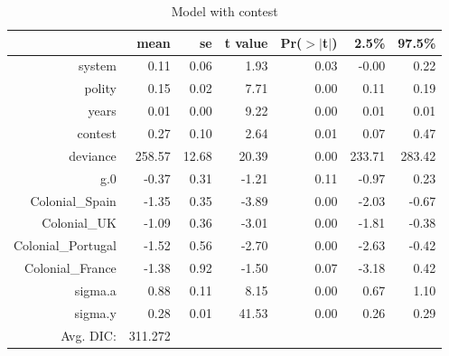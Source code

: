 \documentclass[12pt]{article}
\begin{document}
\begin{table}[ht]
\centering
\begin{tabular}{rrrrrrr}
  \hline
 & mean & se & t value & Pr($>$$|$t$|$) & 2.5\% & 97.5\% \\ 
  \hline
system & 0.11 & 0.06 & 1.93 & 0.03 & -0.00 & 0.22 \\ 
  polity & 0.15 & 0.02 & 7.71 & 0.00 & 0.11 & 0.19 \\ 
  years & 0.01 & 0.00 & 9.22 & 0.00 & 0.01 & 0.01 \\ 
  contest & 0.27 & 0.10 & 2.64 & 0.01 & 0.07 & 0.47 \\ 
  deviance & 258.57 & 12.68 & 20.39 & 0.00 & 233.71 & 283.42 \\ 
  g.0 & -0.37 & 0.31 & -1.21 & 0.11 & -0.97 & 0.23 \\ 
  Colonial\_Spain & -1.35 & 0.35 & -3.89 & 0.00 & -2.03 & -0.67 \\ 
  Colonial\_UK & -1.09 & 0.36 & -3.01 & 0.00 & -1.81 & -0.38 \\ 
  Colonial\_Portugal & -1.52 & 0.56 & -2.70 & 0.00 & -2.63 & -0.42 \\ 
  Colonial\_France & -1.38 & 0.92 & -1.50 & 0.07 & -3.18 & 0.42 \\ 
  sigma.a & 0.88 & 0.11 & 8.15 & 0.00 & 0.67 & 1.10 \\ 
  sigma.y & 0.28 & 0.01 & 41.53 & 0.00 & 0.26 & 0.29 \\ 
   \hline
Avg. DIC:&311.272\\
\hline
\end{tabular}
\caption{Model with contest} 
\end{table}
\end{document}
